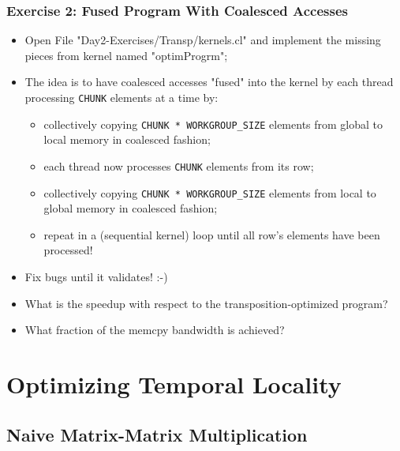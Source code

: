 \documentclass{beamer}
\begin{document}
\begin{frame}[fragile,t]
  \frametitle{Exercise 2: Fused Program With Coalesced Accesses}

\begin{itemize}
    \item Open File "Day2-Exercises/Transp/kernels.cl" and implement the missing pieces from kernel named "optimProgrm";\bigskip
    \item The idea is to have coalesced accesses "fused" into the kernel by each 
            thread processing {\tt CHUNK} elements at a time by:\smallskip
    \begin{itemize}
        \item collectively copying {\tt CHUNK * WORKGROUP\_SIZE} elements from global to local memory
                in coalesced fashion;\smallskip
        \item each thread now processes {\tt CHUNK} elements from its row;\smallskip
        \item collectively copying {\tt CHUNK * WORKGROUP\_SIZE} elements from local to global memory
                in coalesced fashion;\smallskip
        \item repeat in a (sequential kernel) loop until all row's elements have been processed! 
    \end{itemize}\bigskip
    \item Fix bugs until it validates! :-)\bigskip
    \item What is the speedup with respect to the transposition-optimized program?\bigskip
    \item What fraction of the memcpy bandwidth is achieved? 
\end{itemize}


\end{frame}


\section{Optimizing Temporal Locality}

\begin{frame}[fragile]
	\tableofcontents[currentsection]
\end{frame}

\subsection{Naive Matrix-Matrix Multiplication}
\end{document}
